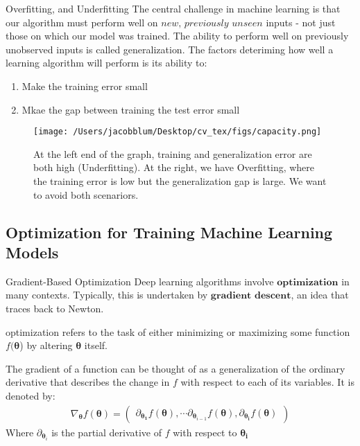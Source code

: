 \documentclass{beamer}
\begin{document}
\begin{frame}[plain]{Overfitting, and Underfitting}
\small{The central challenge in machine learning is that our algorithm must perform well on $\textit{new, previously unseen}$ inputs - not just those
on which our model was trained. The ability to perform well on previously unobserved inputs is called generalization. The factors deteriming how well a learning algorithm will perform is its ability to:}


\begin{enumerate}
    \item Make the training error small
    \item Mkae the gap between training the test error small
\end{enumerate}

\begin{figure}
    \centering
        \texttt{[image: /Users/jacobblum/Desktop/cv\_tex/figs/capacity.png]}
        \caption{At the left end of the graph, training and generalization error are both high (Underfitting). At the right, we have 
        Overfitting, where the training error is low but the generalization gap is large. We want to avoid both scenariors.}
    \end{figure}
\end{frame}

\subsection{Optimization for Training Machine Learning Models}

\begin{frame}[plain]{Gradient-Based Optimization}
    Deep learning algorithms involve $\textbf{optimization}$ in many contexts. Typically, this is undertaken by $\textbf{gradient descent}$, an idea that traces back to Newton.
    \begin{definition}
        \small{optimization refers to the task of either minimizing or maximizing some function $f(\boldsymbol{\theta}$) by altering $\boldsymbol{\theta}$ itself.}
    \end{definition}

\begin{definition}
    \small{The gradient of a function can be thought of as a generalization of the ordinary derivative that describes the change in $f$ with respect to each of its variables. 
    It is denoted by:}
    \begin{align*}
        \nabla_{\boldsymbol{\theta}} f(\boldsymbol{\theta}) = \begin{pmatrix}
            \partial_{\boldsymbol{\theta_{1}}} f(\boldsymbol{\theta}) , \cdots \partial_{\boldsymbol{\theta}_{i-1}} f(\boldsymbol{\theta}), \partial_{\boldsymbol{\theta_{i}}} f(\boldsymbol{\theta})
        \end{pmatrix} 
    \end{align*}
    Where $\partial_{\boldsymbol{\theta}_{i}}$ is the partial derivative of $f$ with respect to $\boldsymbol{\theta_{i}}$
\end{definition}    
\end{frame}
\end{document}
